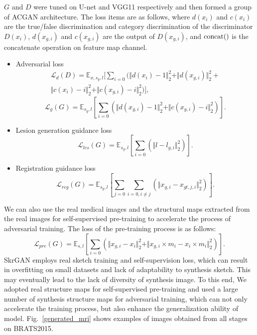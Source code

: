 \documentclass[runningheads]{llncs}
\begin{document}
	$G$ and $D$ were tuned on U-net and VGG11 respectively and then formed a group of ACGAN\cite{98odena2016conditional} architecture. The loss items are as follows, where $d(x_{i})$ and $c(x_{i})$ are the true/false discrimination and category discrimination of the discriminator $D(x_i)$, $d(x_{g, i})$ and $c(x_{g,i})$ are the output of $D(x_{g,i})$, and ${\rm concat}()$ is the concatenate operation on feature map channel. 
	\begin{itemize}
		\item{Adversarial loss}
		\begin{equation}
		\begin{split}
		\mathcal{L}_{d}(D)=\mathbb{E}_{x,s_g,l}[\sum\limits_{i=0}(\Vert{d(x_i)-1}\Vert_{2}^{2}+\Vert{d(x_{g,i})}\Vert_{2}^{2}+\\
		\Vert{c(x_i)-i}\Vert_{2}^{2}+\Vert{c(x_{g,i})-i}\Vert_{2}^{2})],
		\end{split}
		\end{equation}
		\begin{equation}
		\mathcal{L}_{g}(G)=\mathbb{E}_{s_g,l}[\sum\limits_{i=0}(\Vert{d(x_{g,i})-1}\Vert_{2}^{2}+\Vert{c(x_{g,i})-i}\Vert_{2}^{2})].
		\end{equation}
		\item{Lesion generation guidance loss}
		\begin{equation}
		\mathcal{L}_{les}(G)=\mathbb{E}_{s_g,l}[\sum\limits_{i=0}(\Vert{l-l_{g,i}}\Vert_{2}^{2})].
		\end{equation}
		\item{Registration guidance loss}
		\begin{equation}
		\mathcal{L}_{reg}(G)=\mathbb{E}_{s_g,l}[\sum\limits_{j=0}\sum\limits_{i=0,i\neq j}(\Vert{x_{g,i}-x_{gt,j,i}}\Vert_{2}^{2})].
		\end{equation}
	\end{itemize}
	We can also use the real medical images and the structural maps extracted from the real images for self-supervised pre-training to accelerate the process of adversarial training. The loss of the pre-training process is as follows:
	\begin{equation}
	\mathcal{L}_{pre}(G)=\mathbb{E}_{s,l}[\sum\limits_{i=0}(\Vert{x_{g,i}-x_i}\Vert_{2}^{2}+\Vert{x_{g,i}\times m_i-x_{i}\times m_i}\Vert_{2}^{2})].
	\end{equation}
	SkrGAN\cite{96zhang2019skrgan:} employs real sketch training and self-supervision loss, which can result in overfitting on small datasets and lack of adaptability to synthesis sketch. This may eventually lead to the lack of diversity of synthesis image. To this end, We adopted real structure maps for self-supervised pre-training and used a large number of synthesis structure maps for adversarial training, which can not only accelerate the training process, but also enhance the generalization ability of model. Fig.~\ref{generated_mri} shows examples of images obtained from all stages on BRATS2015.
\end{document}
